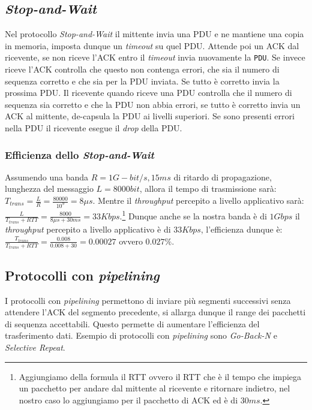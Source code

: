     \subsection{\textit{Stop-and-Wait}}
        Nel protocollo \textit{Stop-and-Wait} il mittente invia una \Acrshort*{PDU} e ne mantiene una copia in memoria, imposta dunque un \textit{timeout} su quel \Acrshort*{PDU}. Attende poi un \Acrshort*{ACK} dal ricevente, se non riceve l'\Acrshort*{ACK} entro il \textit{timeout} invia nuovamente la \texttt{PDU}. Se invece riceve l'\Acrshort*{ACK} controlla che questo non contenga errori, che sia il numero di sequenza corretto e che sia per la \Acrshort*{PDU} inviata. Se tutto è corretto invia la prossima \Acrshort*{PDU}. Il ricevente quando riceve una \Acrshort*{PDU} controlla che il numero di sequenza sia corretto e che la \Acrshort*{PDU} non abbia errori, se tutto è corretto invia un \Acrshort*{ACK} al mittente, de-capsula la \Acrshort*{PDU} ai livelli superiori. Se sono presenti errori nella \Acrshort*{PDU} il ricevente esegue il \textit{drop} della \Acrshort*{PDU}.
        \subsubsection{Efficienza dello \textit{Stop-and-Wait}}
            Assumendo una banda $ R = 1 G-bit/s, 15ms $ di ritardo di propagazione, lunghezza del messaggio $ L = 8000bit $, allora il tempo di trasmissione sarà: $T_{trans} = \frac{L}{R} = \frac{80000}{10^9} = 8\mu s$. Mentre il \textit{throughput} percepito a livello applicativo sarà: $ \frac{L}{T_{trans}+RTT}= \frac{8000}{8\mu s + 30ms} = 33 Kbps $.\footnote{Aggiungiamo della formula il \Acrshort*{RTT} ovvero il \acrlong*{RTT} che è il tempo che impiega un pacchetto per andare dal mittente al ricevente e ritornare indietro, nel nostro caso lo aggiungiamo per il pacchetto di \Acrshort*{ACK} ed è di $ 30ms $.} Dunque anche se la nostra banda è di $ 1 Gbps $ il \textit{throughput} percepito a livello applicativo è di $ 33 Kbps $, l'efficienza dunque è: $ \frac{T_{trans}}{T_{trans}+RTT} = \frac{0.008}{0.008+30} = 0.00027 $ ovvero $ 0.027\% $.
    \subsection{Protocolli con \textit{pipelining}}
        I protocolli con \textit{pipelining} permettono di inviare più segmenti successivi senza attendere l'\Acrshort*{ACK} del segmento precedente, si allarga dunque il range dei pacchetti di sequenza accettabili. Questo permette di aumentare l'efficienza del trasferimento dati. Esempio di protocolli con \textit{pipelining} sono \textit{Go-Back-N} e \textit{Selective Repeat}.
